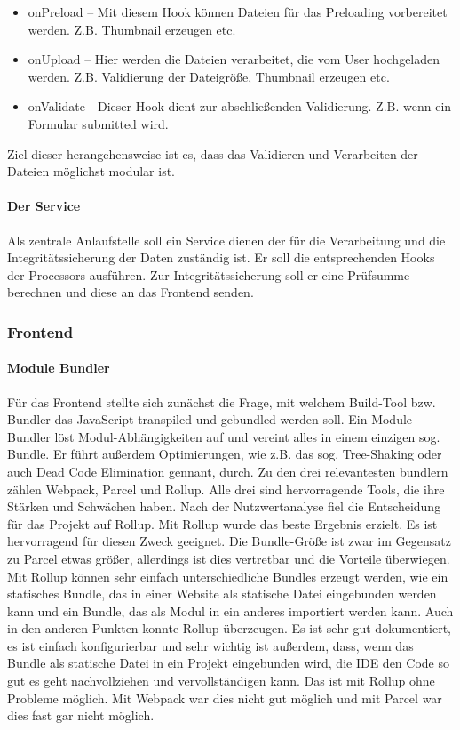 \begin{itemize}
	\item onPreload 	– Mit diesem Hook können Dateien für das Preloading vorbereitet werden. Z.B. Thumbnail erzeugen etc.
	\item onUpload 		– Hier werden die Dateien verarbeitet, die vom User hochgeladen werden. Z.B. Validierung der Dateigröße, Thumbnail erzeugen etc.
	\item onValidate	- Dieser Hook dient zur abschließenden Validierung. Z.B. wenn ein Formular submitted wird.
\end{itemize}

Ziel dieser herangehensweise ist es, dass das Validieren und Verarbeiten der Dateien möglichst modular ist.

\paragraph{Der Service} Als zentrale Anlaufstelle soll ein Service dienen der für die Verarbeitung und die Integritätssicherung der Daten zuständig ist. Er soll die entsprechenden Hooks der Processors ausführen. Zur Integritätssicherung soll er eine Prüfsumme berechnen und diese an das Frontend senden.

\subsubsection{Frontend}
\label{sec:Frontend}

\paragraph{Module Bundler} Für das Frontend stellte sich zunächst die Frage, mit welchem Build-Tool bzw. Bundler das JavaScript transpiled und gebundled werden soll. Ein Module-Bundler löst Modul-Abhängigkeiten auf und vereint alles in einem einzigen sog. Bundle. Er führt außerdem Optimierungen, wie z.B. das sog. Tree-Shaking oder auch Dead Code Elimination gennant, durch. Zu den drei relevantesten bundlern zählen Webpack, Parcel und Rollup. Alle drei sind hervorragende Tools, die ihre Stärken und Schwächen haben. Nach der Nutzwertanalyse fiel die Entscheidung für das Projekt auf Rollup. Mit Rollup wurde das beste Ergebnis erzielt. Es ist hervorragend für diesen Zweck geeignet. Die Bundle-Größe ist zwar im Gegensatz zu Parcel etwas größer, allerdings ist dies vertretbar und die Vorteile überwiegen. Mit Rollup können sehr einfach unterschiedliche Bundles erzeugt werden, wie ein statisches Bundle, das in einer Website als statische Datei eingebunden werden kann und ein Bundle, das als Modul in ein anderes importiert werden kann. Auch in den anderen Punkten konnte Rollup überzeugen. Es ist sehr gut dokumentiert, es ist einfach konfigurierbar und sehr wichtig ist außerdem, dass, wenn das Bundle als statische Datei in ein Projekt eingebunden wird, die IDE den Code so gut es geht nachvollziehen und vervollständigen kann. Das ist mit Rollup ohne Probleme möglich. Mit Webpack war dies nicht gut möglich und mit Parcel war dies fast gar nicht möglich. 

